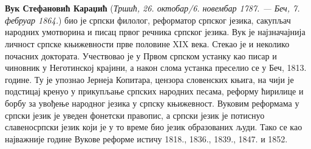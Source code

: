 \documentclass[12pt,oneside]{memoir}
\begin{document}


\nocite{*}
\literatura\

\backmatter\

\begin{biografija}
\textbf{Вук Стефановић Караџић} (\emph{Тршић, 26. октобар/6. новембар
  1787. — Беч, 7. фебруар 1864.}) био је српски филолог, реформатор
српског језика, сакупљач народних умотворина и писац првог речника
српског језика.  Вук је најзначајнија личност српске књижевности прве
половине XIX века. Стекао је и неколико почасних доктората.
Учествовао је у Првом српском устанку као писар и чиновник у
Неготинској крајини, а након слома устанка преселио се у Беч,
1813. године. Ту је упознао Јернеја Копитара, цензора словенских
књига, на чији је подстицај кренуо у прикупљање српских народних
песама, реформу ћирилице и борбу за увођење народног језика у српску
књижевност. Вуковим реформама у српски језик је уведен фонетски
правопис, а српски језик је потиснуо славеносрпски језик који је у то
време био језик образованих људи. Тако се као најважније године Вукове
реформе истичу 1818., 1836., 1839., 1847. и 1852.
\end{biografija}
\end{document}
